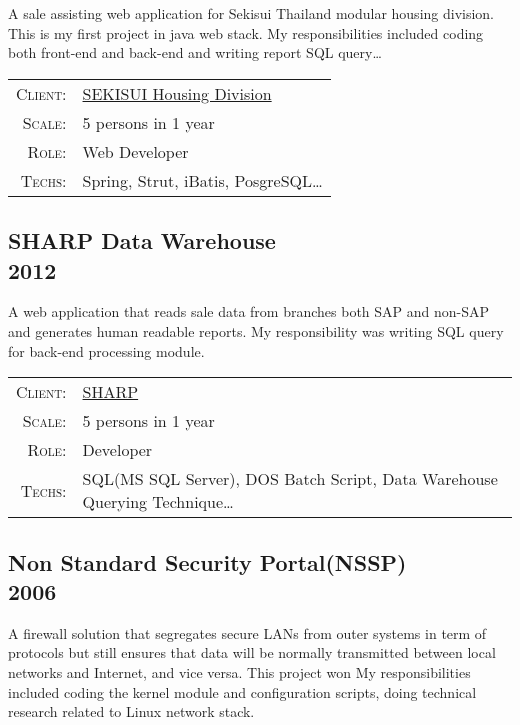 \documentclass[a4paper,10pt]{article}
\begin{document}
A sale assisting web application for Sekisui Thailand modular housing division.
This is my first project in java web stack.
My responsibilities included coding both front-end and back-end and writing report SQL query\ldots

\begin{tabular}{rl}
    \textsc{Client:} & \href{http://www.sekisuichemical.com/about/division/housing/}{SEKISUI Housing Division}\\
    \textsc{Scale:} & 5 persons in 1 year\\
    \textsc{Role:} & Web Developer\\
    \textsc{Techs:} & Spring, Strut, iBatis, PosgreSQL\ldots\\
\end{tabular}

\subsection*{SHARP Data Warehouse\\\small 2012}

A web application that reads sale data from branches both SAP and non-SAP and generates human readable reports.
My responsibility was writing SQL query for back-end processing module.

\begin{tabular}{rl}
    \textsc{Client:} & \href{http://www.sharp-world.com/}{SHARP}\\
    \textsc{Scale:} & 5 persons in 1 year\\
    \textsc{Role:} & Developer\\
    \textsc{Techs:} & SQL(MS SQL Server), DOS Batch Script, Data Warehouse Querying Technique\ldots\\
\end{tabular}

\subsection*{Non Standard Security Portal(NSSP)\\\small 2006}

A firewall solution that segregates secure LANs from outer systems in term of protocols but still ensures that data will be normally transmitted between local networks and Internet, and vice versa.
This project won
My responsibilities included coding the kernel module and configuration scripts, doing technical research related to Linux network stack.
\end{document}
